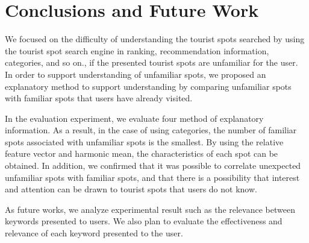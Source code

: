 \documentclass[journal]{IAENGtran}
\begin{document}
\section{Conclusions and Future Work}
\label{sec:Conclusions and Future Work}
We focused on the difficulty of understanding the tourist spots searched by using the tourist spot search engine in ranking, recommendation information, categories, and so on., if the presented tourist spots are unfamiliar for the user.
In order to support understanding of unfamiliar spots, we proposed an explanatory method to support understanding by comparing unfamiliar spots with familiar spots that users have already visited.

In the evaluation experiment, we evaluate four method of explanatory information.
As a result, in the case of using categories, the number of familiar spots associated with unfamiliar spots is the smallest.
By using the relative feature vector and harmonic mean, the characteristics of each spot can be obtained.
In addition, we confirmed that it was possible to correlate unexpected unfamiliar spots with familiar spots, and that there is a possibility that interest and attention can be drawn to tourist spots that users do not know.

As future works, we analyze experimental result such as the relevance between keywords presented to users.
We also plan to evaluate the effectiveness and relevance of each keyword presented to the user.
\end{document}
